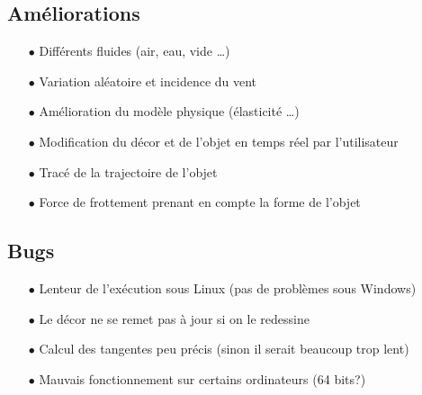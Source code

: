 \subsection{Améliorations}
\begin{itemize}
\item[$\bullet$] Différents fluides (air, eau, vide \dots)
\item[$\bullet$] Variation aléatoire et incidence du vent 
\item[$\bullet$] Amélioration du modèle physique (élasticité \dots )
\item[$\bullet$] Modification du décor et de l'objet en temps réel par l'utilisateur
\item[$\bullet$] Tracé de la trajectoire de l'objet
\item[$\bullet$] Force de frottement prenant en compte la forme de l'objet
\end{itemize}
\subsection{Bugs}
\begin{itemize}
\item[$\bullet$] Lenteur de l'exécution sous Linux (pas de problèmes sous Windows)
\item[$\bullet$] Le décor ne se remet pas à jour si on le redessine
\item[$\bullet$] Calcul des tangentes peu précis (sinon il serait beaucoup trop lent)
\item[$\bullet$] Mauvais fonctionnement sur certains ordinateurs (64 bits?)
\end{itemize}
